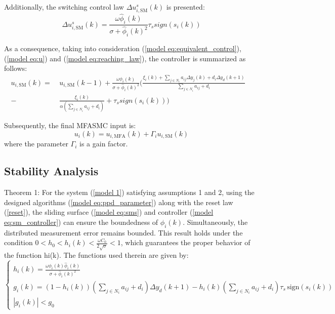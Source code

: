 \documentclass[journal,onecolumn]{IEEEtran}
\begin{document}
Additionally, the switching control law $ \Delta u_{i,\text{SM}}^s(k) $ is presented:
\begin{equation}
    \label{model eq:reaching_law}
    \Delta u_{i,\text{SM}}^s(k) = \frac{\omega \hat{\phi}_i(k)}{\sigma + \hat{\phi}_i(k)^2}\tau_s sign(s_i(k))
\end{equation}

As a consequence, taking into consideration (\ref{model eq:equivalent_control}), (\ref{model eq:u}) and (\ref{model eq:reaching_law}), the controller is summarized as follows:
\begin{align}
    \label{model eq:sm_controller}
    u_{i,\text{SM}}(k) =\ & u_{i,\text{SM}}(k-1) +  \frac{\omega \hat{\phi}_i(k)}{\sigma + \hat{\phi}_i(k)^2} \bigg( \frac{\xi_i(k)+ \sum_{j \in N_i}a_{ij} \Delta y_j(k) + d_i \Delta y_d(k+1)}{\sum_{j \in N_i}a_{ij}+d_i} \quad \nonumber  \\
    - \ & \frac{\xi_i(k)}{\alpha(\displaystyle \sum_{j \in N_i}a_{ij}+d_i)} + \tau_s sign(s_i(k)) \bigg)
\end{align}
    
Subsequently, the final MFASMC input is:
\begin{equation}
    \label{model eq:mfasmc}
    u_i(k) = u_{i,\text{MFA}}(k) + \Gamma_i  u_{i,\text{SM}}(k)
\end{equation}
where the parameter \(\Gamma_i\) is a gain factor.


\subsection{Stability Analysis}

Theorem 1: For the system (\ref{model 1}) satisfying assumptions 1 and 2, using  the designed algorithms (\ref{model eq:ppd_parameter}) along with the reset law (\ref{reset}), the sliding surface (\ref{model eq:sms}) and controller (\ref{model eq:sm_controller}) can ensure the boundedness of $ \hat{\phi}_i(k) $. Simultaneously, the distributed measurement error remains bounded. This result holds under the condition $ 0<h_0<h_i(k)<\frac{\omega C_0}{2 \sqrt{\sigma}} <1  $, which guarantees the proper behavior of the function hi(k). The functions used therein are given by: 
\[
\begin{cases} 
    h_i(k) = \frac{\omega \phi_i(k) \hat{\phi}_i(k)}{\sigma + \hat{\phi}_i(k)^2} \\
    g_i(k) = (1 - h_i(k))\left( \sum_{j \in N_i} a_{ij} + d_i \right)\Delta y_d(k+1) - h_i(k)\left( \sum_{j \in N_i} a_{ij} + d_i \right)\tau_s\, \text{sign}(s_i(k)) \\
    |g_i(k)| < g_0
\end{cases}
\]
\end{document}

